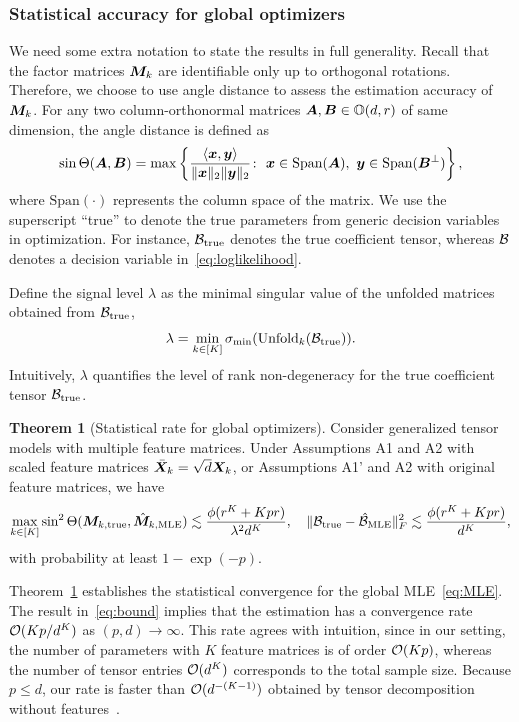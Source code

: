 \documentclass[12pt]{article}
\theoremstyle{definition}
\newtheorem{thm}{Theorem}[section]
\theoremstyle{definition}
\begin{document}
\subsubsection{Statistical accuracy for global optimizers}\label{sec:global}
We need some extra notation to state the results in full generality. Recall that the factor matrices $\bm M_k$ are identifiable only up to orthogonal rotations. Therefore, we choose to use angle distance to assess the estimation accuracy of $\bm M_k$. For any two column-orthonormal matrices $\bm A,\bm B\in\mathbb{O}(d,r)$ of same dimension, the angle distance is defined as
\[
\sin \Theta(\bm A,\bm B)=\max\left\{ \frac{\langle \bm x, \bm{y}\rangle}{\lVert\bm x\rVert_2\lVert\bm{y}\rVert_2}\colon \ \bm x\in \textup{Span}(\bm A),\ \bm{y}\in \textup{Span}(\bm B^{\perp})\right\},
\]
where $\text{Span}(\cdot)$ represents the column space of the matrix. We use the superscript ``true'' to denote the true parameters from generic decision variables in optimization. For instance, $\mathcal{B}_{\textup{true}}$ denotes the true coefficient tensor, whereas $\mathcal{B}$ denotes a decision variable in~\eqref{eq:loglikelihood}. 

Define the signal level $\lambda$ as the minimal singular value of the unfolded matrices obtained from $\mathcal{B}_{\textup{true}}$,  
\[
\lambda=\min_{k\in[K]}\sigma_{\min}(\text{Unfold}_k(\mathcal{B}_{\text{true}})).
\]
Intuitively, $\lambda$ quantifies the level of rank non-degeneracy for the true coefficient tensor $\mathcal{B}_{\textup{true}}$. 

\begin{thm}[Statistical rate for global optimizers]\label{thm:MLE}Consider generalized tensor models with multiple feature matrices. Under Assumptions A1 and A2 with scaled feature matrices $\bar {\bm X}_k= \sqrt{d}\bm X_k$, or Assumptions A1' and A2 with original feature matrices, we have
\begin{equation}\label{eq:bound}
\max_{k\in[K]}\sin^2\Theta(\bm M_{k,\textup{true}}, \hat {\bm M}_{k,\text{MLE}})\lesssim {\phi (r^K+Kpr)\over \lambda^2 d^K}, \quad \lVert\mathcal{B}_{\text{true}}-\hat {\mathcal{B}}_{\text{MLE}} \rVert_F^2\lesssim {\phi (r^K+Kpr) \over d^K},
\end{equation}
with probability at least $1-\exp(-p)$.
\end{thm}
Theorem~\ref{thm:MLE} establishes the statistical convergence for the global MLE~\eqref{eq:MLE}. The result in~\eqref{eq:bound} implies that the estimation has a convergence rate $\mathcal{O}(Kp/d^{K})$ as $(p,d)\to \infty$. {\color{blue}This rate agrees with intuition, since in our setting, the number of parameters with $K$ feature matrices is of order $\mathcal{O}(Kp)$, whereas the number of tensor entries $\mathcal{O}(d^K)$ corresponds to the total sample size. Because $p\leq d$, our rate is faster than $\mathcal{O}(d^{-(K-1)})$ obtained by tensor decomposition without features~\citep{wang2020learning}.} 
\end{document}

